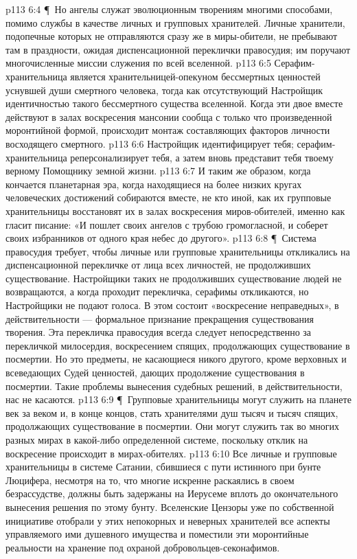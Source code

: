 \vs p113 6:4 \P\ Но ангелы служат эволюционным творениям многими способами, помимо службы в качестве личных и групповых хранителей. Личные хранители, подопечные которых не отправляются сразу же в миры\hyp{}обители, не пребывают там в праздности, ожидая диспенсационной переклички правосудия; им поручают многочисленные миссии служения по всей вселенной.
\vs p113 6:5 Серафим\hyp{}хранительница является хранительницей\hyp{}опекуном бессмертных ценностей уснувшей души смертного человека, тогда как отсутствующий Настройщик  идентичностью такого бессмертного существа вселенной. Когда эти двое вместе действуют в залах воскресения мансонии сообща с только что произведенной моронтийной формой, происходит монтаж составляющих факторов личности восходящего смертного.
\vs p113 6:6 Настройщик идентифицирует тебя; серафим\hyp{}хранительница реперсонализирует тебя, а затем вновь представит тебя твоему верному Помощнику земной жизни.
\vs p113 6:7 И таким же образом, когда кончается планетарная эра, когда находящиеся на более низких кругах человеческих достижений собираются вместе, не кто иной, как их групповые хранительницы восстановят их в залах воскресения миров\hyp{}обителей, именно как гласит писание: «И пошлет своих ангелов с трубою громогласной, и соберет своих избранников от одного края небес до другого».
\vs p113 6:8 \P\ Система правосудия требует, чтобы личные или групповые хранительницы откликались на диспенсационной перекличке от лица всех личностей, не продолживших существование. Настройщики таких не продолживших существование людей не возвращаются, а когда проходит перекличка, серафимы откликаются, но Настройщики не подают голоса. В этом состоит «воскресение неправедных», в действительности --- формальное признание прекращения существования творения. Эта перекличка правосудия всегда следует непосредственно за перекличкой милосердия, воскресением спящих, продолжающих существование в посмертии. Но это предметы, не касающиеся никого другого, кроме верховных и всеведающих Судей ценностей, дающих продолжение существования в посмертии. Такие проблемы вынесения судебных решений, в действительности, нас не касаются.
\vs p113 6:9 \P\ Групповые хранительницы могут служить на планете век за веком и, в конце концов, стать хранителями душ тысяч и тысяч спящих, продолжающих существование в посмертии. Они могут служить так во многих разных мирах в какой\hyp{}либо определенной системе, поскольку отклик на воскресение происходит в мирах\hyp{}обителях.
\vs p113 6:10 Все личные и групповые хранительницы в системе Сатании, сбившиеся с пути истинного при бунте Люцифера, несмотря на то, что многие искренне раскаялись в своем безрассудстве, должны быть задержаны на Иерусеме вплоть до окончательного вынесения решения по этому бунту. Вселенские Цензоры уже по собственной инициативе отобрали у этих непокорных и неверных хранителей все аспекты управляемого ими душевного имущества и поместили эти моронтийные реальности на хранение под охраной добровольцев\hyp{}секонафимов.
